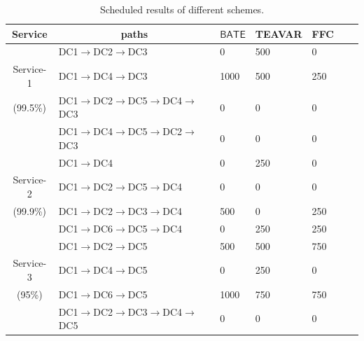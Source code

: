 \documentclass[sigconf]{acmart}
\begin{document}
 \begin{table}
\scriptsize
\centering
\caption{Scheduled results of different schemes.}\label{testbed-1}
\renewcommand{\arraystretch}{1.0}
\begin{tabular}{|c|l|l|l|l|ll} \hline
\setlength{\tabcolsep}{10pt}
{Service}&\multicolumn{1}{|c|}{paths}&\multicolumn{1}{|c|}{$\mathsf{BATE}$}&\multicolumn{1}{|c|}{TEAVAR}&\multicolumn{1}{|c|}{FFC}\\
\hline
&{DC1$\to$DC2$\to$DC3}&0&500&0\\
{Service-1}&{DC1$\to$DC4$\to$DC3}&1000&500&250\\
(99.5\%)&{DC1$\to$DC2$\to$DC5$\to$DC4$\to$DC3}&0&0&0\\
&{DC1$\to$DC4$\to$DC5$\to$DC2$\to$DC3}&0&0&0\\
\hline
&{DC1$\to$DC4}&0&250&0\\
{Service-2}&{DC1$\to$DC2$\to$DC5$\to$DC4}&0&0&0\\
(99.9\%)&{DC1$\to$DC2$\to$DC3$\to$DC4}&500&0&250\\
&{DC1$\to$DC6$\to$DC5$\to$DC4}&0&250&250\\
\hline
&{DC1$\to$DC2$\to$DC5}&500&500&750\\
{Service-3}&{DC1$\to$DC4$\to$DC5}&0&250&0\\
(95\%)&{DC1$\to$DC6$\to$DC5}&1000&750&750\\
&{DC1$\to$DC2$\to$DC3$\to$DC4$\to$DC5}&0&0&0\\
\hline
\end{tabular}
\end{table}
\end{document}
